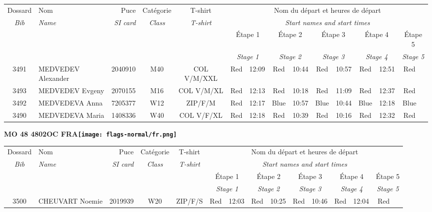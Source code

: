 \documentclass{report}
\begin{document}
  \begin{longtable}{|c|l|r|c|c|*{5}{cc|}}
    Dossard & Nom  & Puce    & Catégorie & T-shirt & \multicolumn{10}{c|}{Nom du départ et heures de départ} \\
    \itshape Bib     & \itshape Name & \itshape SI card & \itshape Class  & \itshape  T-shirt  & \multicolumn{10}{c|}{\itshape Start names and start times} \\
    \hline
    & & & & & \multicolumn{2}{c|}{Étape 1} & \multicolumn{2}{c|}{Étape 2} & \multicolumn{2}{c|}{Étape 3} & \multicolumn{2}{c|}{Étape 4} & \multicolumn{2}{c|}{Étape 5} \\
    & & & & & \multicolumn{2}{c|}{\itshape Stage 1} & \multicolumn{2}{c|}{\itshape Stage 2} & \multicolumn{2}{c|}{\itshape Stage 3} & \multicolumn{2}{c|}{\itshape Stage 4} & \multicolumn{2}{c|}{\itshape Stage 5} \\
    \hline
    3491 & MEDVEDEV Alexander & 2040910 & M40 & COL V/M/XXL & Red & 12:09 & Red & 10:44 & Red & 10:57 & Red & 12:51 & Red &  \\
    3493 & MEDVEDEV Evgeny & 2070155 & M16 & COL V/M/XL & Red & 12:13 & Red & 10:18 & Red & 11:09 & Red & 12:37 & Red &  \\
    3492 & MEDVEDEVA Anna & 7205377 & W12 & ZIP/F/M & Red & 12:17 & Blue & 10:57 & Blue & 10:44 & Blue & 12:18 & Blue &  \\
    3490 & MEDVEDEVA Maria & 1408336 & W40 & COL V/F/XL & Red & 12:18 & Red & 10:39 & Red & 10:16 & Red & 12:32 & Red &  \\
  \end{longtable}
\newpage
  \Huge \centering \bfseries MO 48 4802OC FRA\normalfont \footnotesize \sffamily \hfill \texttt{[image: flags-normal/fr.png]} \newline 
  \begin{longtable}{|c|l|r|c|c|*{5}{cc|}}
    Dossard & Nom  & Puce    & Catégorie & T-shirt & \multicolumn{10}{c|}{Nom du départ et heures de départ} \\
    \itshape Bib     & \itshape Name & \itshape SI card & \itshape Class  & \itshape  T-shirt  & \multicolumn{10}{c|}{\itshape Start names and start times} \\
    \hline
    & & & & & \multicolumn{2}{c|}{Étape 1} & \multicolumn{2}{c|}{Étape 2} & \multicolumn{2}{c|}{Étape 3} & \multicolumn{2}{c|}{Étape 4} & \multicolumn{2}{c|}{Étape 5} \\
    & & & & & \multicolumn{2}{c|}{\itshape Stage 1} & \multicolumn{2}{c|}{\itshape Stage 2} & \multicolumn{2}{c|}{\itshape Stage 3} & \multicolumn{2}{c|}{\itshape Stage 4} & \multicolumn{2}{c|}{\itshape Stage 5} \\
    \hline
    3500 & CHEUVART Noemie & 2019939 & W20 & ZIP/F/S & Red & 12:03 & Red & 10:25 & Red & 10:46 & Red & 12:04 & Red &  \\
  \end{longtable}
\end{document}
